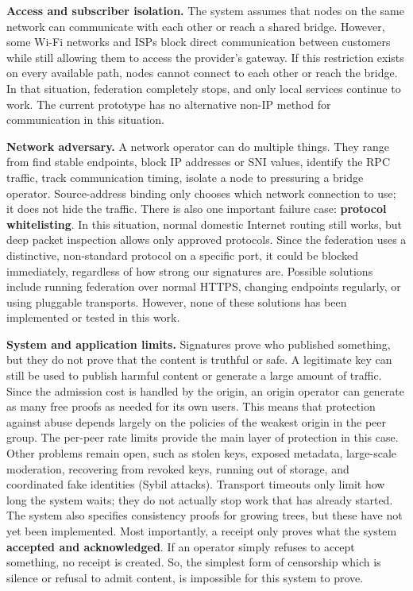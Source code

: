 \documentclass[conference,a4paper]{IEEEtran}
\begin{document}
\textbf{Access and subscriber isolation.} The system assumes that nodes on the same network can communicate with each other or reach a shared bridge. However, some Wi-Fi networks and ISPs block direct communication between customers while still allowing them to access the provider's gateway. If this restriction exists on every available path, nodes cannot connect to each other or reach the bridge. In that situation, federation completely stops, and only local services continue to work. The current prototype has no alternative non-IP method for communication in this situation.

\textbf{Network adversary.} A network operator can do multiple things. They range from find stable endpoints, block IP addresses or SNI values, identify the RPC traffic, track communication timing, isolate a node to pressuring a bridge operator. Source-address binding only chooses which network connection to use; it does not hide the traffic. There is also one important failure case: \textbf{protocol whitelisting}. In this situation, normal domestic Internet routing still works, but deep packet inspection allows only approved protocols. Since the federation uses a distinctive, non-standard protocol on a specific port, it could be blocked immediately, regardless of how strong our signatures are. Possible solutions include running federation over normal HTTPS, changing endpoints regularly, or using pluggable transports. However, none of these solutions has been implemented or tested in this work.

\textbf{System and application limits.} Signatures prove who published something, but they do not prove that the content is truthful or safe. A legitimate key can still be used to publish harmful content or generate a large amount of traffic. Since the admission cost is handled by the origin, an origin operator can generate as many free proofs as needed for its own users. This means that protection against abuse depends largely on the policies of the weakest origin in the peer group. The per-peer rate limits provide the main layer of protection in this case. Other problems remain open, such as stolen keys, exposed metadata, large-scale moderation, recovering from revoked keys, running out of storage, and coordinated fake identities (Sybil attacks). Transport timeouts only limit how long the system waits; they do not actually stop work that has already started. The system also specifies consistency proofs for growing trees, but these have not yet been implemented. Most importantly, a receipt only proves what the system \textbf{accepted and acknowledged}. If an operator simply refuses to accept something, no receipt is created. So, the simplest form of censorship which is silence or refusal to admit content, is impossible for this system to prove.
\end{document}
